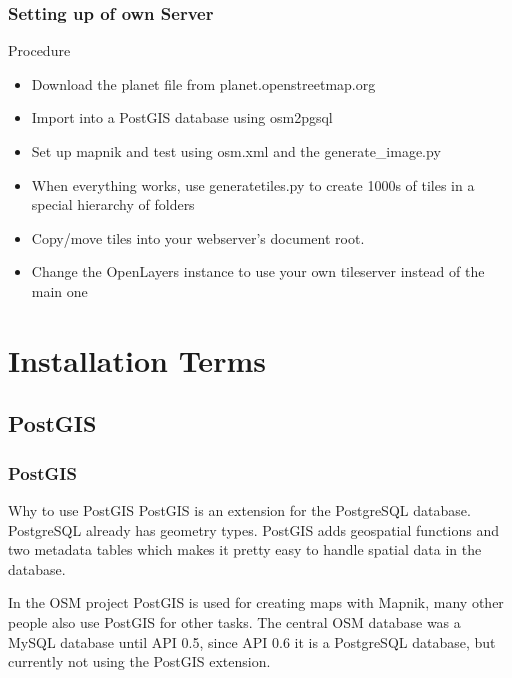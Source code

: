 \documentclass{beamer}
\begin{document}
\begin{frame}
\frametitle{Setting up of own Server}
\begin{block}{Procedure}
\begin{itemize}
\pause
\item Download the planet file from planet.openstreetmap.org
\pause
\item Import into a PostGIS database using osm2pgsql
\pause
\item Set up mapnik and test using osm.xml and the generate\_image.py
\pause
\item When everything works, use generatetiles.py to create 1000s of tiles in a special hierarchy of folders
\pause
\item Copy/move tiles into your webserver's document root.
\pause
\item Change the OpenLayers instance to use your own tileserver instead of the main one
\end{itemize}
\end{block}
\end{frame}

\section{Installation Terms}
\subsection{PostGIS}
\begin{frame}
\frametitle{PostGIS}
\begin{block}{Why to use PostGIS}
PostGIS is an extension for the PostgreSQL database. PostgreSQL already has geometry types. PostGIS adds geospatial functions and two metadata tables which makes it pretty easy to handle spatial data in the database.
\end{block}
\pause
\begin{block}{}
In the OSM project PostGIS is used for creating maps with Mapnik, many other people also use PostGIS for other tasks. The central OSM database was a MySQL database until API 0.5, since API 0.6 it is a PostgreSQL database, but currently not using the PostGIS extension.
\end{block}
\end{frame}
\end{document}
